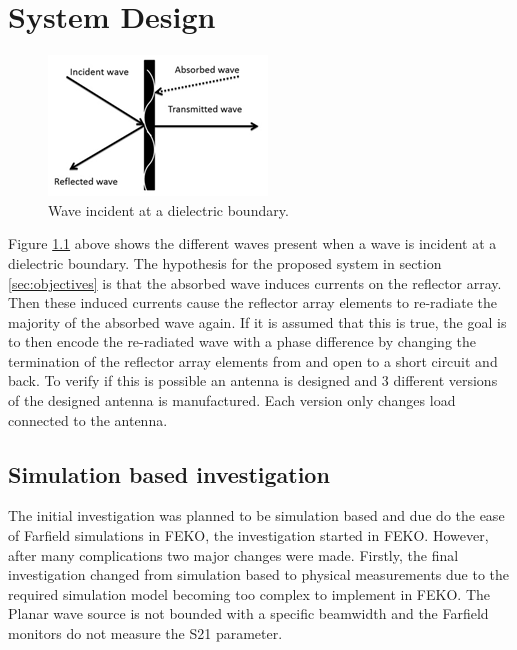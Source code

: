 %
%
%
\chapter{System Design \label{ch:design}}\label{sec:SysD}
\vspace{0.5cm}

    \begin{figure}[H]
    \centering
    \includegraphics[width=0.4\linewidth]{Figures/chp3_incident_wave.png}
    \caption{Wave incident at a dielectric boundary.}
    \label{fig:chp3_incident_wave}
    \end{figure}
    
Figure \ref{fig:chp3_incident_wave} above shows the different waves present when a wave is incident at a dielectric boundary. The hypothesis for the proposed system in section \ref{sec:objectives} is that the absorbed wave induces currents on the reflector array. Then these induced currents cause the reflector array elements to re-radiate the majority of the absorbed wave again. If it is assumed that this is true, the goal is to then encode the re-radiated wave with a phase difference by changing the termination of the reflector array elements from and open to a short circuit and back. To verify if this is possible an antenna is designed and 3 different versions of the designed antenna is manufactured. Each version only changes load connected to the antenna.

\section{Simulation based investigation}
The initial investigation was planned to be simulation based and due do the ease of Farfield simulations in FEKO, the investigation started in FEKO. However, after many complications two major changes were made. Firstly, the final investigation changed from simulation based to physical measurements due to the required simulation model becoming too complex to implement in FEKO. The Planar wave source is not bounded with a specific beamwidth and the Farfield monitors do not measure the S21 parameter.

